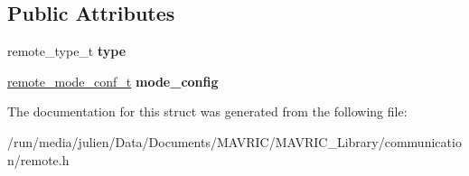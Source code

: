 \subsection*{Public Attributes}
\begin{DoxyCompactItemize}
\item 
\hypertarget{structremote__conf__t_ae5b32e89f411617a45c7f9efa04dab7e}{remote\+\_\+type\+\_\+t {\bfseries type}}\label{structremote__conf__t_ae5b32e89f411617a45c7f9efa04dab7e}

\item 
\hypertarget{structremote__conf__t_afb0477d7a256c834c8c06eab1292ecc4}{\hyperlink{structremote__mode__conf__t}{remote\+\_\+mode\+\_\+conf\+\_\+t} {\bfseries mode\+\_\+config}}\label{structremote__conf__t_afb0477d7a256c834c8c06eab1292ecc4}

\end{DoxyCompactItemize}


The documentation for this struct was generated from the following file\+:\begin{DoxyCompactItemize}
\item 
/run/media/julien/\+Data/\+Documents/\+M\+A\+V\+R\+I\+C/\+M\+A\+V\+R\+I\+C\+\_\+\+Library/communication/remote.\+h\end{DoxyCompactItemize}

